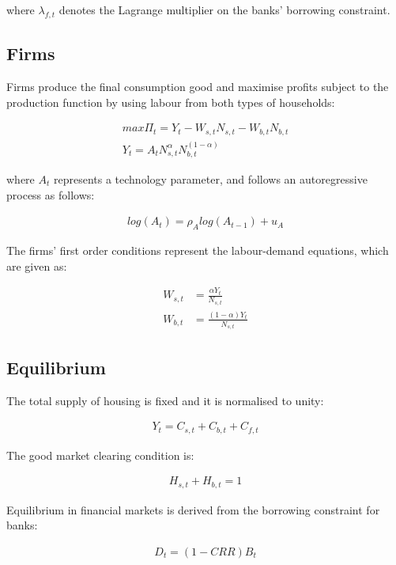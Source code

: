 \documentclass[final,3p,times,twocolumn]{elsarticle}
\begin{document}
where  $\lambda_{f,t}$ denotes the Lagrange multiplier on the banks' borrowing constraint.

 \subsection{Firms}

Firms produce the final consumption good and maximise profits subject to the production function by using labour from both types of households:

\begin{align}
max \displaystyle \Pi_t = Y_t - W_{s,t}N_{s,t} - W_{b,t}N_{b,t} \nonumber \\
Y_t = A_t N_{s,t}^\alpha N_{b,t}^{(1-\alpha)}
\end{align}

where $A_t$ represents a technology parameter, and follows an autoregressive process as follows:

\begin{align}
log(A_t) = \rho_A log(A_{t-1}) + u_A
\end{align}

The firms' first order conditions represent the labour-demand equations, which are given as:

\begin{align}
W_{s,t} &= \frac{\alpha Y_t}{N_{s,t}} \\
W_{b,t} &= \frac{(1-\alpha)Y_t}{N_{s,t}} 
\end{align}

 \subsection{Equilibrium}

The total supply of housing is fixed and it is normalised to unity:

\begin{align}
Y_t = C_{s,t} + C_{b,t} + C_{f,t}
\end{align}

The good market clearing condition is:

\begin{align}
H_{s,t} + H_{b,t} = 1 
\end{align}

Equilibrium in financial markets is derived from the borrowing constraint for banks:

\begin{align}
D_t = (1-CRR)B_t 
\end{align}
\end{document}
